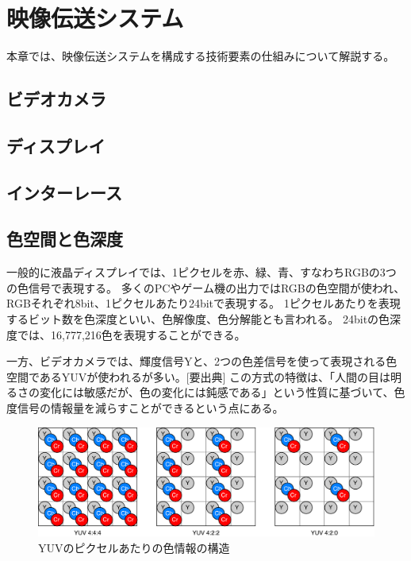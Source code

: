 \chapter{映像伝送システム}
\label{chap:video-transmission}

本章では、映像伝送システムを構成する技術要素の仕組みについて解説する。

\section{ビデオカメラ}
\label{sec:camera}


\section{ディスプレイ}
\label{sec:display}


\section{インターレース}
\label{sec:interlace}


\section{色空間と色深度}
\label{sec:colorspace}

一般的に液晶ディスプレイでは、1ピクセルを赤、緑、青、すなわちRGBの3つの色信号で表現する。
多くのPCやゲーム機の出力ではRGBの色空間が使われ、RGBそれぞれ8bit、1ピクセルあたり24bitで表現する。
1ピクセルあたりを表現するビット数を色深度といい、色解像度、色分解能とも言われる。
24bitの色深度では、16,777,216色を表現することができる。

一方、ビデオカメラでは、輝度信号Yと、2つの色差信号を使って表現される色空間であるYUVが使われるが多い。[要出典]
この方式の特徴は、「人間の目は明るさの変化には敏感だが、色の変化には鈍感である」という性質に基づいて、色度信号の情報量を減らすことができるという点にある。

\begin{figure}[htbp]
    \begin{center}
        \includegraphics[bb=0 0 681 222,width=14cm]{img/yuv-pixel-structure.pdf}
    \end{center}
    \caption{YUVのピクセルあたりの色情報の構造}
    \label{fig:yuv-pixel-structure}
\end{figure}

